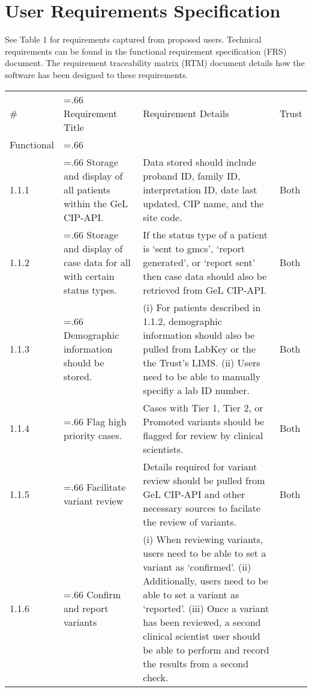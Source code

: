 \documentclass[a4paper, 10pt]{article}
\begin{document}
\section{User Requirements Specification}
See Table 1 for requirements captured from proposed users. Technical requirements can be found in the functional requirement specification (FRS) document. The requirement traceability matrix (RTM) document details how the software has been designed to these requirements.

\renewcommand*{\arraystretch}{1.3}
\begin{table}[h]
\centering
\label{tab:urs}
\begin{tabularx}{\textwidth}{@{}l>{\hsize=.66\hsize}X>{\hsize=1.33\hsize}Xl@{}}
\rowcolor[HTML]{333333} 
{\color[HTML]{FFFFFF} \#} & {\color[HTML]{FFFFFF} Requirement Title} & {\color[HTML]{FFFFFF} Requirement Details}                                                                                            & {\color[HTML]{FFFFFF} Trust} \\
\rowcolor[HTML]{C0C0C0} 
Functional
&
&
&
\\
1.1.1
& Storage and display of all patients within the GeL CIP-API.
& Data stored should include proband ID, family ID, interpretation ID, date last updated, CIP name, and the site code.
& Both
\\
1.1.2
& Storage and display of case data for all with certain status types.
& If the status type of a patient is `sent to gmcs', `report generated', or `report sent' then case data should also be retrieved from GeL CIP-API.
& Both
\\
1.1.3
& Demographic information should be stored.
& (i) For patients described in 1.1.2, demographic information should also be pulled from LabKey or the the Trust's LIMS. (ii) Users need to be able to manually specifiy a lab ID number.
& Both
\\
1.1.4
& Flag high priority cases.
& Cases with Tier 1, Tier 2, or Promoted variants should be flagged for review by clinical scientists.
& Both
\\
1.1.5
& Facilitate variant review
& Details required for variant review should be pulled from GeL CIP-API and other necessary sources to facilate the review of variants.
& Both
\\
1.1.6
& Confirm and report variants 
& (i) When reviewing variants, users need to be able to set a variant as `confirmed'. (ii) Additionally, users need to be able to set a variant as `reported'. (iii) Once a variant has been reviewed, a second clinical scientist user should be able to perform and record the results from a second check.

\end{tabularx}
\end{table}
\end{document}
